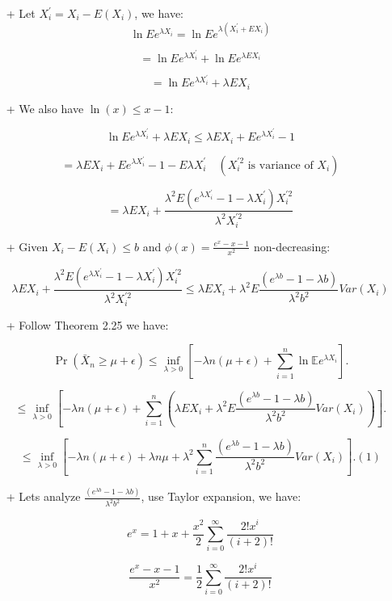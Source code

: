 \begin{itemize}
    \item[+] Let $X_i^{'} = X_i - E(X_i)$, we have:
    \[
    \ln Ee^{\lambda X_i} = \ln Ee^{\lambda(X_i^{'} + EX_i)}
    \]

    \[
    = \ln Ee^{\lambda X_i^{'}} +\ln Ee^{\lambda EX_i}
    \]
    
    \[
    = \ln Ee^{\lambda X_i^{'}} + \lambda EX_i
    \]
    \item[+] We also have $\ln(x) \leq x - 1$:

    \[
    \ln Ee^{\lambda X_i^{'}} + \lambda EX_i \leq\lambda EX_i + Ee^{\lambda X_i^{'}} - 1
    \]

    \[
     = \lambda EX_i + Ee^{\lambda X_i^{'}} - 1 - E\lambda X_i^{'} \quad (X_i^{'2} \mbox{ is variance of  } X_i)
    \]

    \[
     = \lambda EX_i + \frac{\lambda ^ 2 E(e^{\lambda X_i^{'}} - 1 - \lambda X_i^{'})X_i^{'2}}{\lambda ^ 2 X_i^{'2}}
    \]

    + Given $X_i - E(X_i) \leq b$ and $\phi(x) = \frac{e^x - x - 1}{x^2}$ non-decreasing:

    \[
     \lambda EX_i + \frac{\lambda ^ 2 E(e^{\lambda X_i^{'}} - 1 - \lambda X_i^{'})X_i^{'2}}{\lambda ^ 2 X_i^{'2}} \leq \lambda EX_i + \lambda ^ 2 E\frac{(e^{\lambda b} - 1 - \lambda b)}{\lambda ^ 2 b^2} Var(X_i)
    \]

    \item[+] Follow Theorem 2.25 we have:
    
    \[
    \Pr(\bar{X}_n \geq \mu + \epsilon) \leq \inf_{\lambda>0} 
    \left[ -\lambda n(\mu + \epsilon) + \sum_{i=1}^n \ln \mathbb{E} e^{\lambda X_i} \right].
    \]
    
    \[
    \leq \inf_{\lambda>0} 
    \left[ -\lambda n(\mu + \epsilon) + \sum_{i=1}^n (\lambda EX_i + \lambda ^ 2 E\frac{(e^{\lambda b} - 1 - \lambda b)}{\lambda ^ 2 b^2} Var(X_i)) \right].
    \]

    \[
    \leq \inf_{\lambda>0} 
    \left[ -\lambda n(\mu + \epsilon) +  \lambda n \mu + \lambda ^ 2 \sum_{i=1}^n\frac{(e^{\lambda b} - 1 - \lambda b)}{\lambda^2 b^2}Var(X_i) \right]. (1)
    \]

    \item[+] Lets analyze $\frac{(e^{\lambda b} - 1 - \lambda b)}{\lambda^2 b^2}$, use Taylor expansion, we have:

    \[
    e^x = 1 + x + \frac{x^2}{2}\sum_{i=0}^\infty \frac{2!x^i}{(i + 2)!}
    \]

    \[
    \frac{e^x - x - 1}{x^2} = \frac{1}{2}\sum_{i=0}^\infty \frac{2!x^i}{(i + 2)!}
    \]


\end{itemize}
